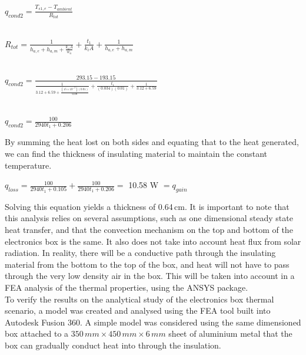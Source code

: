 \begin{center}
 $q_{cond2} = \frac{T_{s1,e}-T_{ambient}}{R_{tot}} $\\
 
 \ 
 
 $R_{tot} = \frac{1}{h_{a,e}+h_{a,m}+\frac{k_{a}A}{w_{a}}} + \frac{t_{1}}{k_{i}A} + \frac{1}{h_{a,e}+h_{a,m}}  $\\
 
 \
 \ 
 
 $q_{cond2} = \frac{293.15 - 193.15}{\frac{1}{3.12+6.59+\frac{(15\times10^{-3})(0.01)}{0.08}} + \frac{t_{1}}{(0.034)(0.01)} + \frac{1}{3.12+6.59}} $\\
 
 \  
 \ 
 
 $q_{cond2} = \frac{100}{2940t_{1}+0.206} $\\
 
\end{center}

By summing the heat lost on both sides and equating that to the heat generated, we can find the thickness of insulating material to maintain the constant temperature. \\

\begin{center}
 $q_{loss} = \frac{100}{2940t_{1}+0.105} + \frac{100}{2940t_{1}+0.206} =$ 
10.58 W
$= q_{gain} $\\
\end{center}

Solving this equation yields a thickness of 0.64\,cm. It is important to note that this analysis relies on several assumptions, such as one dimensional steady state heat transfer, and that the convection mechanism on the top and bottom of the electronics box is the same. It also does not take into account heat flux from solar radiation. In reality, there will be a conductive path through the insulating material from the bottom to the top of the box, and heat will not have to pass through the very low density air in the box. This will be taken into account in a FEA analysis of the thermal properties, using the ANSYS package. \\

To verify the results on the analytical study of the electronics box thermal scenario, a model was created and analysed using the FEA tool built into Autodesk Fusion 360. A simple model was considered using the same dimensioned box attached to a $350 \,mm \times 450\,mm \times 6\,mm$ sheet of aluminium metal that the box can gradually conduct heat into through the insulation. \\

